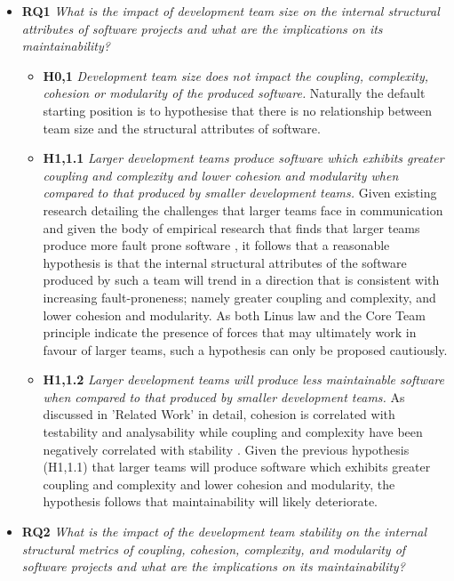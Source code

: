 \begin{itemize}
\item  \textbf{RQ1} \textit{What is the impact of development team size on the internal structural attributes of software projects and what are the implications on its maintainability?}
\begin{itemize}
\item \textbf{H0,1} \textit{Development team size does not impact the coupling, complexity, cohesion or modularity of the produced software.} Naturally the default starting position is to hypothesise that there is no relationship between team size and the structural attributes of software. 
\item \textbf{H1,1.1} \textit{Larger development teams produce software which exhibits greater coupling and complexity and lower cohesion and modularity when compared to that produced by smaller development teams.} Given existing research detailing the challenges that larger teams face in communication \citep{brooks1986mythical} and given the body of empirical research that finds that larger teams produce more fault prone software \citep{weyuker2008too, nagappan2008influence, meneely2009secure, foucault2015usefulness}, it follows that a reasonable hypothesis is that the internal structural attributes of the software produced by such a team will trend in a direction that is consistent with increasing fault-proneness; namely greater coupling and complexity, and lower cohesion and modularity. As both Linus law and the Core Team principle indicate the presence of forces that may ultimately work in favour of larger teams, such a hypothesis can only be proposed cautiously.
\item \textbf{H1,1.2} \textit{Larger development teams will produce less maintainable software when compared to that produced by smaller development teams.} As discussed in 'Related Work' in detail, cohesion is correlated with testability \citep{badri2011empirical} and analysability \citep{boehm1978characteristics} while coupling and complexity have been negatively correlated with stability \citep{elish2003investigation}. Given the previous hypothesis (H1,1.1) that larger teams will produce software which exhibits greater coupling and complexity and lower cohesion and modularity, the hypothesis follows that maintainability will likely deteriorate.
\end{itemize}
\item \textbf{RQ2} \textit{What is the impact of the development team stability on the internal structural metrics of coupling, cohesion, complexity, and modularity of software projects and what are the implications on its maintainability?}

\end{itemize}
